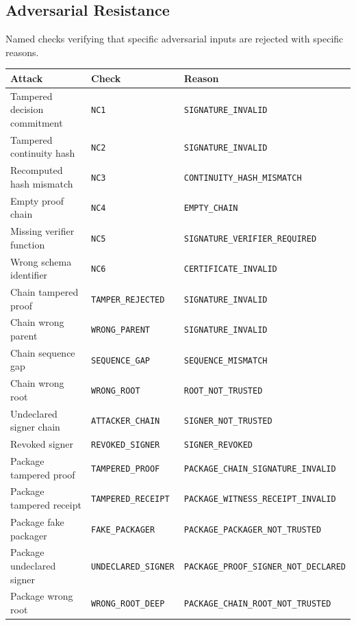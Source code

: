 \documentclass[11pt,a4paper]{article}
\begin{document}
\subsection{Adversarial Resistance}

Named checks verifying that specific adversarial inputs are rejected with specific reasons.

{\small
\begin{longtable}{@{}p{5cm}p{4.5cm}p{5.5cm}@{}}
\toprule
Attack & Check & Reason \\
\midrule
\endhead
Tampered decision commitment & \texttt{NC1} & \texttt{SIGNATURE\_INVALID} \\
Tampered continuity hash & \texttt{NC2} & \texttt{SIGNATURE\_INVALID} \\
Recomputed hash mismatch & \texttt{NC3} & \texttt{CONTINUITY\_HASH\_MISMATCH} \\
Empty proof chain & \texttt{NC4} & \texttt{EMPTY\_CHAIN} \\
Missing verifier function & \texttt{NC5} & \texttt{SIGNATURE\_VERIFIER\_REQUIRED} \\
Wrong schema identifier & \texttt{NC6} & \texttt{CERTIFICATE\_INVALID} \\
Chain tampered proof & \texttt{TAMPER\_REJECTED} & \texttt{SIGNATURE\_INVALID} \\
Chain wrong parent & \texttt{WRONG\_PARENT} & \texttt{SIGNATURE\_INVALID} \\
Chain sequence gap & \texttt{SEQUENCE\_GAP} & \texttt{SEQUENCE\_MISMATCH} \\
Chain wrong root & \texttt{WRONG\_ROOT} & \texttt{ROOT\_NOT\_TRUSTED} \\
Undeclared signer chain & \texttt{ATTACKER\_CHAIN} & \texttt{SIGNER\_NOT\_TRUSTED} \\
Revoked signer & \texttt{REVOKED\_SIGNER} & \texttt{SIGNER\_REVOKED} \\
Package tampered proof & \texttt{TAMPERED\_PROOF} & \texttt{PACKAGE\_CHAIN\_SIGNATURE\_INVALID} \\
Package tampered receipt & \texttt{TAMPERED\_RECEIPT} & \texttt{PACKAGE\_WITNESS\_RECEIPT\_INVALID} \\
Package fake packager & \texttt{FAKE\_PACKAGER} & \texttt{PACKAGE\_PACKAGER\_NOT\_TRUSTED} \\
Package undeclared signer & \texttt{UNDECLARED\_SIGNER} & \texttt{PACKAGE\_PROOF\_SIGNER\_NOT\_DECLARED} \\
Package wrong root & \texttt{WRONG\_ROOT\_DEEP} & \texttt{PACKAGE\_CHAIN\_ROOT\_NOT\_TRUSTED} \\

\end{longtable}}
\end{document}
